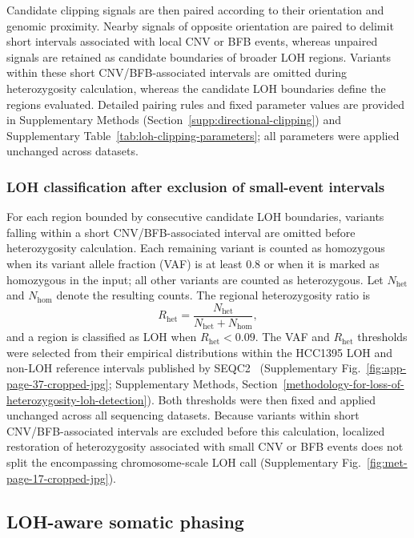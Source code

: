 \documentclass[pdflatex,sn-nature]{sn-jnl}
\begin{document}
Candidate clipping signals are then paired according to their orientation and genomic proximity. Nearby signals of opposite orientation are paired to delimit short intervals associated with local CNV or BFB events, whereas unpaired signals are retained as candidate boundaries of broader LOH regions. Variants within these short CNV/BFB-associated intervals are omitted during heterozygosity calculation, whereas the candidate LOH boundaries define the regions evaluated. Detailed pairing rules and fixed parameter values are provided in Supplementary Methods (Section~\ref{supp:directional-clipping}) and Supplementary Table~\ref{tab:loh-clipping-parameters}; all parameters were applied unchanged across datasets.

\subsubsection{LOH classification after exclusion of small-event intervals}

For each region bounded by consecutive candidate LOH boundaries, variants falling within a short CNV/BFB-associated interval are omitted before heterozygosity calculation. Each remaining variant is counted as homozygous when its variant allele fraction (VAF) is at least 0.8 or when it is marked as homozygous in the input; all other variants are counted as heterozygous. Let \(N_{\mathrm{het}}\) and \(N_{\mathrm{hom}}\) denote the resulting counts. The regional heterozygosity ratio is
\[
R_{\mathrm{het}}=\frac{N_{\mathrm{het}}}{N_{\mathrm{het}}+N_{\mathrm{hom}}},
\]
and a region is classified as LOH when \(R_{\mathrm{het}}<0.09\). The VAF and \(R_{\mathrm{het}}\) thresholds were selected from their empirical distributions within the HCC1395 LOH and non-LOH reference intervals published by SEQC2~\cite{fang2021} (Supplementary Fig.~\ref{fig:app-page-37-cropped-jpg}; Supplementary Methods, Section~\ref{methodology-for-loss-of-heterozygosity-loh-detection}). Both thresholds were then fixed and applied unchanged across all sequencing datasets. Because variants within short CNV/BFB-associated intervals are excluded before this calculation, localized restoration of heterozygosity associated with small CNV or BFB events does not split the encompassing chromosome-scale LOH call (Supplementary Fig.~\ref{fig:met-page-17-cropped-jpg}).

\subsection{LOH-aware somatic phasing}\label{haplotype-phasing}
\end{document}
